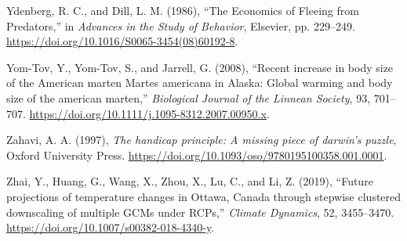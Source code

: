 \documentclass[
  12pt,
  letterpaper,
]{scrartcl}
\newlength{\cslhangindent}
\newenvironment{CSLReferences}[2] %
 {\begin{list}{}{%
  \setlength{\itemindent}{0pt}
  \setlength{\leftmargin}{0pt}
  \setlength{\parsep}{0pt}
  \ifodd #1
   \setlength{\leftmargin}{\cslhangindent}
   \setlength{\itemindent}{-1\cslhangindent}
  \fi
  \setlength{\itemsep}{#2\baselineskip}}}
 {\end{list}}
\begin{document}
\begin{CSLReferences}{1}{0}
Ydenberg, R. C., and Dill, L. M. (1986), {``The {Economics} of {Fleeing}
from {Predators},''} in \emph{Advances in the {Study} of {Behavior}},
Elsevier, pp. 229--249.
\url{https://doi.org/10.1016/S0065-3454(08)60192-8}.

Yom-Tov, Y., Yom-Tov, S., and Jarrell, G. (2008), {``Recent increase in
body size of the {American} marten {Martes} americana in {Alaska}:
{Global} warming and body size of the american marten,''}
\emph{Biological Journal of the Linnean Society}, 93, 701--707.
\url{https://doi.org/10.1111/j.1095-8312.2007.00950.x}.

Zahavi, A. A. (1997), \emph{The handicap principle: A missing piece of
darwin's puzzle}, Oxford University Press.
\url{https://doi.org/10.1093/oso/9780195100358.001.0001}.

Zhai, Y., Huang, G., Wang, X., Zhou, X., Lu, C., and Li, Z. (2019),
{``Future projections of temperature changes in {Ottawa}, {Canada}
through stepwise clustered downscaling of multiple {GCMs} under
{RCPs},''} \emph{Climate Dynamics}, 52, 3455--3470.
\url{https://doi.org/10.1007/s00382-018-4340-y}.

\end{CSLReferences}
\end{document}
